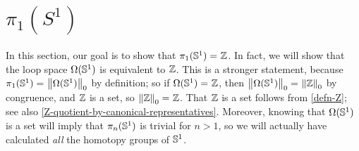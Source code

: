 



\section{\texorpdfstring{$\pi_1(S^1)$}{π₁(S¹)}}
\label{sec:pi1-s1-intro}

In this section, our goal is to show that $\id {\pi_1(\Sn ^1)} {\Z}$.
In fact, we will show that the loop space ${\Omega(\Sn ^1)}$ is equivalent to $\Z$.
This is a stronger statement, because $\id{\pi_1(\Sn ^1)} {\trunc 0 {\Omega(\Sn ^1)}}$ by
definition; so if $\id {\Omega(\Sn ^1)} {\Z}$, then $\id {\trunc
  0 {\Omega(\Sn ^1)}} {\trunc 0 {\Z}}$ by congruence, and
$\Z$ is a set, so $\id {\trunc 0 {\Z}} {\Z}$.
That $\Z$ is a set follows from \autoref{defn-Z}; see also \autoref{Z-quotient-by-canonical-representatives}.
Moreover, knowing that ${\Omega(\Sn ^1)}$ is a set will imply that $\pi_n(\Sn^1)$ is trivial for $n>1$, so we will actually have calculated \emph{all} the homotopy groups of $\Sn^1$.

